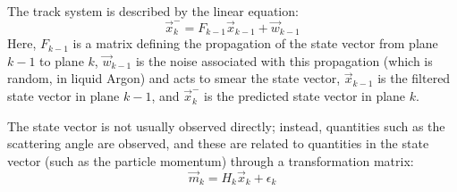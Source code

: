 The track system is described by the linear equation:
\begin{equation}\label{eqn:kalman_track_system}
    \vec{x}_k^{-} = F_{k-1} \vec{x}_{k-1} + \vec{w}_{k-1}
\end{equation}
Here, $F_{k-1}$ is a matrix defining the propagation of the state vector from plane $k-1$ to plane $k$, $\vec{w}_{k-1}$ is the noise associated with this propagation (which is random, in liquid Argon) and acts to smear the state vector, $\vec{x}_{k-1}$ is the filtered state vector in plane $k-1$, and $\vec{x}_k^{-}$ is the predicted state vector in plane $k$.

The state vector is not usually observed directly; instead, quantities such as the scattering angle are observed, and these are related to quantities in the state vector (such as the particle momentum) through a transformation matrix:
\begin{equation}\label{eqn:kalman_measurement_vec}
    \vec{m}_k = H_k \vec{x}_k + \epsilon_k
\end{equation}
